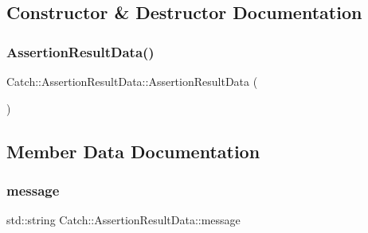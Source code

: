 \subsection{Constructor \& Destructor Documentation}
\hypertarget{struct_catch_1_1_assertion_result_data_a37179edde9f853f22d4456677fd97701}{}\label{struct_catch_1_1_assertion_result_data_a37179edde9f853f22d4456677fd97701} 
\subsubsection{\texorpdfstring{Assertion\+Result\+Data()}{AssertionResultData()}}
{\footnotesize\ttfamily Catch\+::\+Assertion\+Result\+Data\+::\+Assertion\+Result\+Data (\begin{DoxyParamCaption}{ }\end{DoxyParamCaption})\hspace{0.3cm}{\ttfamily [inline]}}



\subsection{Member Data Documentation}
\hypertarget{struct_catch_1_1_assertion_result_data_ac34215803c4c4a88f795879f61c1f7b4}{}\label{struct_catch_1_1_assertion_result_data_ac34215803c4c4a88f795879f61c1f7b4} 
\subsubsection{\texorpdfstring{message}{message}}
{\footnotesize\ttfamily std\+::string Catch\+::\+Assertion\+Result\+Data\+::message}

\hypertarget{struct_catch_1_1_assertion_result_data_a9e809d36fffbeb1c7d0cbe7382dd9595}{}\label{struct_catch_1_1_assertion_result_data_a9e809d36fffbeb1c7d0cbe7382dd9595} 
